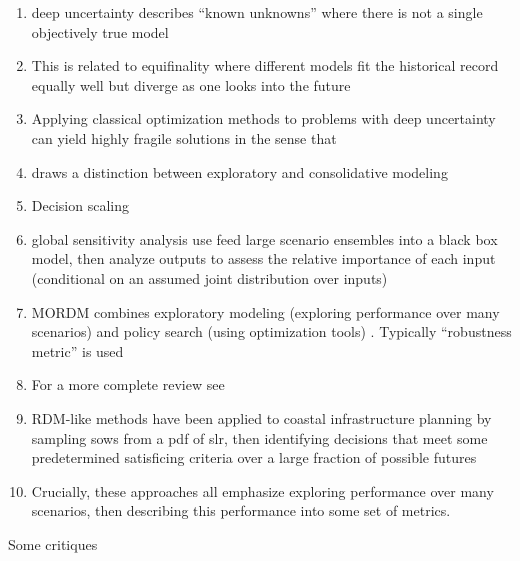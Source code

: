 \documentclass[11pt]{article}
\begin{document}
\begin{enumerate}
    \item deep uncertainty describes ``known unknowns'' where there is not a single objectively true model \citep{walker_deep:2013,Walker:2013gi,lempert_complex:2002}
    \item This is related to equifinality where different models fit the historical record equally well but diverge as one looks into the future \citep{beven_equifinality:2006,DossGollin:2019}
    \item Applying classical optimization methods to problems with deep uncertainty can yield highly fragile solutions in the sense that
    \item \citet{bankes:1993} draws a distinction between exploratory and consolidative modeling
    \item Decision scaling \citep{Steinschneider:2015kk}
    \item global sensitivity analysis \citep{saltelli_sensitivity:2010,herman_salib:2017,sobol_sensitivity:2001} use feed large scenario ensembles into a black box model, then analyze outputs to assess the relative importance of each input (conditional on an assumed joint distribution over inputs)
    \item MORDM \citep{kasprzyk:2013} combines exploratory modeling (exploring performance over many scenarios) and policy search (using optimization tools)  \citep{kasprzyk:2013,kasprzyk_denovo:2012,hadka_mordm:2015}. Typically ``robustness metric'' is used \citep{herman:2015,mcphail_robustness:2019}
    \item For a more complete review see \citet{marchau:2019}
    \item RDM-like methods have been applied to coastal infrastructure planning by sampling \glspl{sow} from a \gls{pdf} of \gls{slr}, then identifying decisions that meet some predetermined satisficing criteria \citep{mcphail_robustness:2019} over a large fraction of possible futures \citep{sriver_sealevel:2018,garner_slrise:2018,lempert_slr:2012}
    \item Crucially, these approaches all emphasize exploring performance over many scenarios, then describing this performance into some set of metrics.
\end{enumerate}
Some critiques
\end{document}
